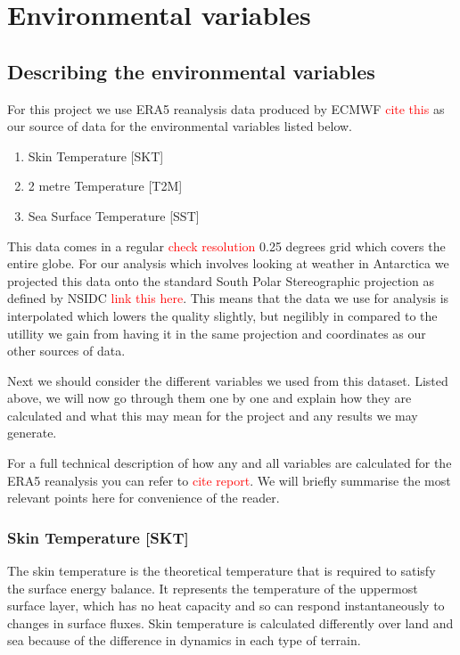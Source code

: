 
\section{Environmental variables}

\subsection{Describing the environmental variables}

For this project we use ERA5 reanalysis data produced by ECMWF \textcolor{red}{cite this} as our source of data for the environmental variables listed below.

\begin{enumerate}
	\item Skin Temperature [SKT]
	\item 2 metre Temperature [T2M]
	\item Sea Surface Temperature [SST]
\end{enumerate}

This data comes in a regular \textcolor{red}{check resolution} 0.25 degrees grid which covers the entire globe. For our analysis which involves looking at weather in Antarctica we projected this data onto the standard South Polar Stereographic projection as defined by NSIDC \textcolor{red}{link this here}.
This means that the data we use for analysis is interpolated which lowers the quality slightly, but negilibly in compared to the utillity we gain from having it in the same projection and coordinates as our other sources of data.

Next we should consider the different variables we used from this dataset. Listed above, we will now go through them one by one and explain how they are calculated and what this may mean for the project and any results we may generate.

For a full technical description of how any and all variables are calculated for the ERA5 reanalysis you can refer to \textcolor{red}{cite report}. We will briefly summarise the most relevant points here for convenience of the reader.

\subsubsection*{Skin Temperature [SKT]}

The skin temperature is the theoretical temperature that is required to satisfy the surface energy balance. It represents the temperature of the uppermost surface layer, which has no heat capacity and so can respond instantaneously to changes in surface fluxes. Skin temperature is calculated differently over land and sea because of the difference in dynamics in each type of terrain.

